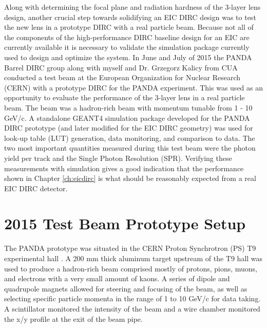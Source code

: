 \label{ch:analysis}

Along with determining the focal plane and radiation hardness of the 3-layer lens design, another crucial step towards solidifying an EIC DIRC design was to test the new lens in a prototype DIRC with a real particle beam. Because not all of the components of the high-performance DIRC baseline design for an EIC are currently available it is necessary to validate the simulation package currently used to design and optimize the system. In June and July of 2015 the PANDA Barrel DIRC group along with myself and Dr. Grzegorz Kalicy from CUA conducted a test beam at the European Organization for Nuclear Research (CERN) with a prototype DIRC for the PANDA experiment. This was used as an opportunity to evaluate the performance of the 3-layer lens in a real particle beam. The beam was a hadron-rich beam with momentum tunable from 1 - 10 GeV/c. A standalone GEANT4 simulation package developed for the PANDA DIRC prototype (and later modified for the EIC DIRC geometry) was used for look-up table (LUT) generation, data monitoring, and comparison to data.
The two most important quantities measured during this test beam were the photon yield per track and the Single Photon Resolution (SPR). Verifying these measurements with simulation gives a good indication that the performance shown in Chapter \ref{ch:eicdirc} is what should be reasonably expected from a real EIC DIRC detector.

\section{2015 Test Beam Prototype Setup}
The PANDA prototype was situated in the CERN Proton Synchrotron (PS) T9 experimental hall \cite{CERN_T9}. A 200 mm thick aluminum target upstream of the T9 hall was used to produce a hadron-rich beam comprised mostly of protons, pions, muons, and electrons with a very small amount of kaons. A series of dipole and quadrupole magnets allowed for steering and focusing of the beam, as well as selecting specific particle momenta in the range of 1 to 10 GeV/c for data taking. A scintillator monitored the intensity of the beam and a wire chamber monitored the x/y profile at the exit of the beam pipe.

